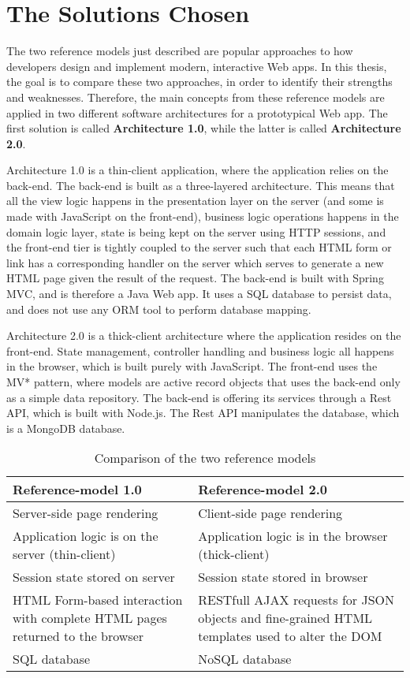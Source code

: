 \section{The Solutions Chosen}
The two reference models just described are popular approaches to how developers design and implement modern, interactive Web apps. In this thesis, the goal is to compare these two approaches, in order to identify their strengths and weaknesses.  Therefore, the main concepts from these reference models are applied in two different software architectures for a prototypical Web app. The first solution is called \textbf{Architecture 1.0}, while the latter is called \textbf{Architecture 2.0}. 

Architecture 1.0 is a thin-client application, where the application relies on the back-end. The back-end is built as a three-layered architecture. This means that all the view logic happens in the presentation layer on the server (and some is made with JavaScript on the front-end), business logic operations happens in the domain logic layer, state is being kept on the server using HTTP sessions, and the front-end tier is tightly coupled to the server such that each HTML form or link has a corresponding handler on the server which serves to generate a new HTML page given the result of the request. The back-end is built with Spring MVC, and is therefore a Java Web app. It uses a SQL database to persist data, and does not use any ORM tool to perform database mapping. 

Architecture 2.0 is a thick-client architecture where the application resides on the front-end. State management, controller handling and business logic all happens in the browser, which is built purely with JavaScript. The front-end uses the MV* pattern, where models are active record objects that uses the back-end only as a simple data repository. The back-end is offering its services through a Rest API, which is built with Node.js. The Rest API manipulates the database, which is a MongoDB database. 
			
\begin{table}
\centering
	\begin{tabularx}
	{\linewidth}{ |X|X | }
	    \hline
	    \textbf{Reference-model 1.0} & \textbf{Reference-model 2.0} \\ \hline
	    Server-side page rendering & Client-side page rendering \\ \hline
	    Application logic is on the server (thin-client) & Application logic is in the browser (thick-client)  \\ \hline
	    Session state stored on server & Session state stored in browser \\ \hline
	    HTML Form-based interaction with complete HTML pages returned to the browser & RESTfull AJAX requests for JSON objects and fine-grained HTML templates used to alter the DOM \\ \hline
	    SQL database & NoSQL database \\ \hline
	    \end{tabularx}
    	    \caption{Comparison of the two reference models}
	    \label{table:compare}
    \end{table}

